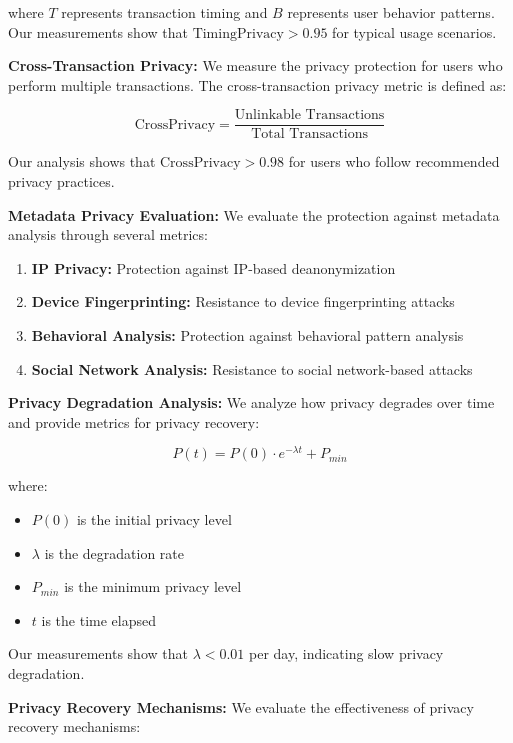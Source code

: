 \documentclass[11pt,a4paper]{article}
\begin{document}
where $T$ represents transaction timing and $B$ represents user behavior patterns. Our measurements show that $\text{TimingPrivacy} > 0.95$ for typical usage scenarios.

\textbf{Cross-Transaction Privacy:}
We measure the privacy protection for users who perform multiple transactions. The cross-transaction privacy metric is defined as:

\begin{equation}
\text{CrossPrivacy} = \frac{\text{Unlinkable Transactions}}{\text{Total Transactions}}
\end{equation}

Our analysis shows that $\text{CrossPrivacy} > 0.98$ for users who follow recommended privacy practices.

\textbf{Metadata Privacy Evaluation:}
We evaluate the protection against metadata analysis through several metrics:

\begin{enumerate}
    \item \textbf{IP Privacy:} Protection against IP-based deanonymization
    \item \textbf{Device Fingerprinting:} Resistance to device fingerprinting attacks
    \item \textbf{Behavioral Analysis:} Protection against behavioral pattern analysis
    \item \textbf{Social Network Analysis:} Resistance to social network-based attacks
\end{enumerate}

\textbf{Privacy Degradation Analysis:}
We analyze how privacy degrades over time and provide metrics for privacy recovery:

\begin{equation}
P(t) = P(0) \cdot e^{-\lambda t} + P_{min}
\end{equation}

where:
\begin{itemize}
    \item $P(0)$ is the initial privacy level
    \item $\lambda$ is the degradation rate
    \item $P_{min}$ is the minimum privacy level
    \item $t$ is the time elapsed
\end{itemize}

Our measurements show that $\lambda < 0.01$ per day, indicating slow privacy degradation.

\textbf{Privacy Recovery Mechanisms:}
We evaluate the effectiveness of privacy recovery mechanisms:
\end{document}
